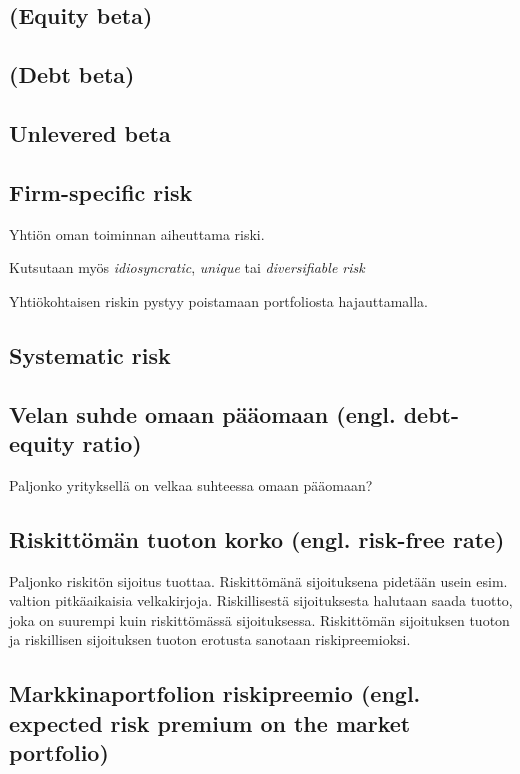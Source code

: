\documentclass[a4paper]{article}
\begin{document}
\subsection{(Equity beta)}

\subsection{(Debt beta)}

\subsection{Unlevered beta}

\subsection{Firm-specific risk}

Yhtiön oman toiminnan aiheuttama riski.

Kutsutaan myös \textit{idiosyncratic}, \textit{unique} tai \textit{diversifiable risk}

Yhtiökohtaisen riskin pystyy poistamaan portfoliosta hajauttamalla.

\subsection{Systematic risk}

\subsection{Velan suhde omaan pääomaan (engl. debt-equity ratio)}

Paljonko yrityksellä on velkaa suhteessa omaan pääomaan?

\subsection{Riskittömän tuoton korko (engl. risk-free rate)}

Paljonko riskitön sijoitus tuottaa. Riskittömänä sijoituksena pidetään usein esim. valtion pitkäaikaisia velkakirjoja. Riskillisestä sijoituksesta halutaan saada tuotto, joka on suurempi kuin riskittömässä sijoituksessa. Riskittömän sijoituksen tuoton ja riskillisen sijoituksen tuoton erotusta sanotaan riskipreemioksi.

\subsection{Markkinaportfolion riskipreemio (engl. expected risk premium on the market portfolio)}
\end{document}
